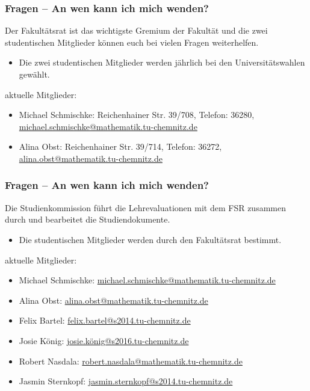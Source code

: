 \begin{frame}
\frametitle{Fragen -- An wen kann ich mich wenden?}
\begin{block}{\vphantom{X}}
	Der Fakultätsrat ist das wichtigste Gremium der Fakultät und die zwei studentischen Mitglieder können euch bei vielen Fragen weiterhelfen.
\end{block}
\begin{itemize}
	\item Die zwei studentischen Mitglieder werden jährlich bei den Universitätswahlen gewählt.
\end{itemize}
aktuelle Mitglieder:
\begin{itemize}
	\item Michael Schmischke: Reichenhainer Str. 39/708, Telefon: 36280, \href{mailto:michael.schmischke@mathematik.tu-chemnitz.de}{michael.schmischke@mathematik.tu-chemnitz.de}   
	\item Alina Obst: Reichenhainer Str. 39/714, Telefon: 36272, \href{mailto:alina.obst@mathematik.tu-chemnitz.de}{alina.obst@mathematik.tu-chemnitz.de}   
\end{itemize}
\end{frame}

\begin{frame}
\frametitle{Fragen -- An wen kann ich mich wenden?}
\begin{block}{\vphantom{X}}
	Die Studienkommission führt die Lehrevaluationen mit dem FSR zusammen durch und bearbeitet die Studiendokumente.
\end{block}
\begin{itemize}
	\item Die studentischen Mitglieder werden durch den Fakultätsrat bestimmt.
\end{itemize}
aktuelle Mitglieder:
\begin{itemize}
	\item Michael Schmischke: \href{mailto:michael.schmischke@mathematik.tu-chemnitz.de}{michael.schmischke@mathematik.tu-chemnitz.de}   
	\item Alina Obst: \href{mailto:alina.obst@mathematik.tu-chemnitz.de}{alina.obst@mathematik.tu-chemnitz.de}  
	\item Felix Bartel: \href{mailto:felix.bartel@s2014.tu-chemnitz.de}{felix.bartel@s2014.tu-chemnitz.de}  
	\item Josie König: \href{mailto:josie.könig@s2016.tu-chemnitz.de}{josie.könig@s2016.tu-chemnitz.de}  
	\item Robert Nasdala: \href{mailto:robert.nasdala@mathematik.tu-chemnitz.de}{robert.nasdala@mathematik.tu-chemnitz.de}  
	\item Jasmin Sternkopf: \href{mailto:jasmin.sternkopf@s2014.tu-chemnitz.de}{jasmin.sternkopf@s2014.tu-chemnitz.de}  
\end{itemize}
\end{frame}

